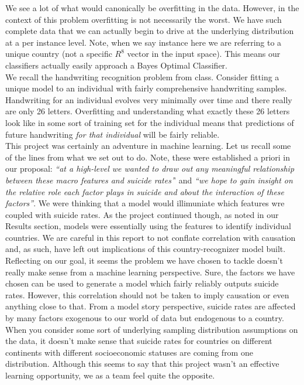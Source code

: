 \documentclass{article}
\begin{document}
\begin{multicols}{2}
We see a lot of what would canonically be overfitting in the data. However, in the context of this problem overfitting is not necessarily the worst. We have such complete data that we can actually begin to drive at the underlying distribution at a per instance level. Note, when we say instance here we are referring to a unique country (not a specific $R^8$ vector in the input space). This means our classifiers actually easily approach a Bayes Optimal Classifier. \\
We recall the handwriting recognition problem from class. Consider fitting a unique model to an individual with fairly comprehensive handwriting samples. Handwriting for an individual evolves very minimally over time and there really are only 26 letters. Overfitting and understanding what exactly these 26 letters look like in some sort of training set for the individual means that predictions of future handwriting \textit{for that individual} will be fairly reliable. \\
This project was certainly an adventure in machine learning. Let us recall some of the lines from what we set out to do. Note, these were established a priori in our proposal: \textit{``at a high-level we wanted to draw out any meaningful relationship between these macro features and suicide rates'}' and \textit{``we hope to gain insight on the
relative role each factor plays in suicide and about the interaction of these factors''}. We were thinking that a model would illimuniate which features wre coupled with suicide rates. As the project continued though, as noted in our Results section, models were essentially using the features to identify individual countries. We are careful in this report to not conflate correlation with causation and, as such, have left out implications of this country-recognizer model built. \\
Reflecting on our goal, it seems the problem we have chosen to tackle doesn't really make sense from a machine learning perspective. Sure, the factors we have chosen can be used to generate a model which fairly reliably outputs suicide rates. However, this correlation should not be taken to imply causation or even anything close to that. From a model story perspective, suicide rates are affected by many factors exogenous to our world of data but endogenous to a country. \\
When you consider some sort of underlying sampling distribution assumptions on the data, it doesn't make sense that suicide rates for countries on different continents with different socioeconomic statuses are coming from one distribution. Although this seems to say that this project wasn't an effective learning opportunity, we as a team feel quite the opposite. \\

\end{multicols}
\end{document}
